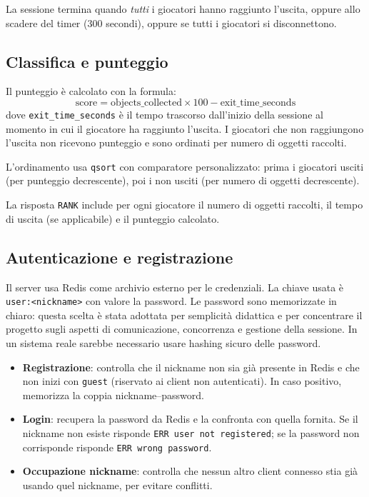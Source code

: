 \documentclass[a4paper,11pt]{article}
\begin{document}
La sessione termina quando \emph{tutti} i giocatori hanno raggiunto l'uscita,
oppure allo scadere del timer (300 secondi), oppure se tutti i giocatori
si disconnettono.

\subsection{Classifica e punteggio}

Il punteggio è calcolato con la formula:
\[
\text{score} = \text{objects\_collected} \times 100 - \text{exit\_time\_seconds}
\]
dove \texttt{exit\_time\_seconds} è il tempo trascorso dall'inizio della
sessione al momento in cui il giocatore ha raggiunto l'uscita. I giocatori
che non raggiungono l'uscita non ricevono punteggio e sono ordinati
per numero di oggetti raccolti.

L'ordinamento usa \texttt{qsort} con comparatore personalizzato:
prima i giocatori usciti (per punteggio decrescente), poi i non usciti
(per numero di oggetti decrescente).

La risposta \texttt{RANK} include per ogni giocatore il numero di oggetti
raccolti, il tempo di uscita (se applicabile) e il punteggio calcolato.

\subsection{Autenticazione e registrazione}

Il server usa Redis come archivio esterno per le credenziali. La chiave
usata è \texttt{user:<nickname>} con valore la password. Le password sono
memorizzate in chiaro: questa scelta è stata adottata per semplicità
didattica e per concentrare il progetto sugli aspetti di comunicazione,
concorrenza e gestione della sessione. In un sistema reale sarebbe
necessario usare hashing sicuro delle password.

\begin{itemize}[topsep=0.3em]
    \item \textbf{Registrazione}: controlla che il nickname non sia già
          presente in Redis e che non inizi con \texttt{guest} (riservato
          ai client non autenticati). In caso positivo, memorizza la
          coppia nickname--password.
    \item \textbf{Login}: recupera la password da Redis e la confronta
          con quella fornita. Se il nickname non esiste risponde
          \texttt{ERR user not registered}; se la password non corrisponde
          risponde \texttt{ERR wrong password}.
    \item \textbf{Occupazione nickname}: controlla che nessun altro client
          connesso stia già usando quel nickname, per evitare conflitti.
\end{itemize}
\end{document}
